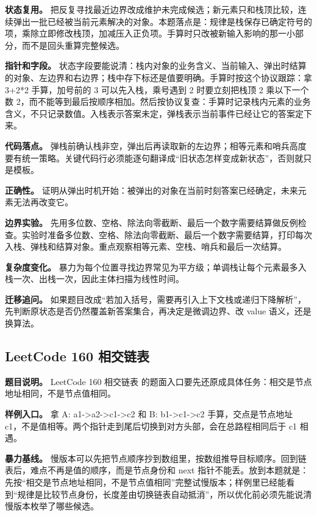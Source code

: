 \textbf{状态复用。} 把反复寻找最近边界改成维护未完成候选；新元素只和栈顶比较，连续弹出一批已经被当前元素解决的对象。本题落点是：规律是栈保存已确定符号的项，乘除立即修改栈顶，加减压入正负项。手算时只改被新输入影响的那一小部分，而不是回头重算完整候选。

\textbf{指针和字段。} 状态字段要能说清：栈内对象的业务含义、当前输入、弹出时结算的对象、左边界和右边界；栈中存下标还是值要明确。手算时按这个协议跟踪：拿 3+2*2 手算，加号前的 3 可以先入栈，乘号遇到 2 时要立刻把栈顶 2 乘以下一个数 2，而不能等到最后按顺序相加。然后按协议复查：手算时记录栈内元素的业务含义，不只记录数值。入栈表示答案未定，弹栈表示当前事件已经让它的答案定下来。

\textbf{代码落点。} 弹栈前确认栈非空，弹出后再读取新的左边界；相等元素和哨兵高度要有统一策略。关键代码行必须能逐句翻译成“旧状态怎样变成新状态”，否则就只是模板。

\textbf{正确性。} 证明从弹出时机开始：被弹出的对象在当前时刻答案已经确定，未来元素无法再改变它。

\textbf{边界实验。} 先用多位数、空格、除法向零截断、最后一个数字需要结算做反例检查。实验时准备多位数、空格、除法向零截断、最后一个数字需要结算，打印每次入栈、弹栈和结算对象。重点观察相等元素、空栈、哨兵和最后一次结算。

\textbf{复杂度变化。} 暴力为每个位置寻找边界常见为平方级；单调栈让每个元素最多入栈一次、出栈一次，因此主体扫描为线性时间。

\textbf{迁移追问。} 如果题目改成“若加入括号，需要再引入上下文栈或递归下降解析”，先判断原状态是否仍然覆盖新答案集合，再决定是微调边界、改 value 语义，还是换算法。

\subsection{LeetCode 160 相交链表}

\textbf{题目说明。} LeetCode 160 相交链表 的题面入口要先还原成具体任务：相交是节点地址相同，不是节点值相同。

\textbf{样例入口。} 拿 A: a1->a2->c1->c2 和 B: b1->c1->c2 手算，交点是节点地址 c1，不是值相等。两个指针走到尾后切换到对方头部，会在总路程相同后于 c1 相遇。

\textbf{暴力基线。} 慢版本可以先把节点顺序抄到数组里，按数组推导目标顺序。回到链表后，难点不再是值的顺序，而是节点身份和 next 指针不能丢。放到本题就是：先按“相交是节点地址相同，不是节点值相同”完整试慢版本；样例里已经能看到“规律是比较节点身份，长度差由切换链表自动抵消”，所以优化前必须先能说清慢版本枚举了哪些候选。


